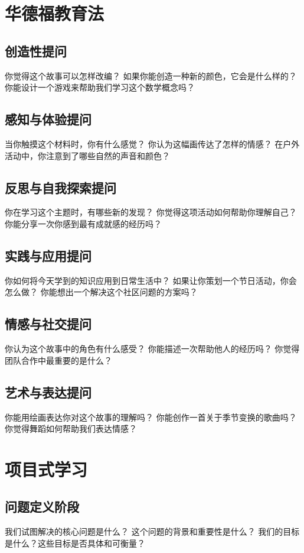 \documentclass[12pt]{book}
\begin{document}
\section{华德福教育法}
\subsection{创造性提问}
你觉得这个故事可以怎样改编？
如果你能创造一种新的颜色，它会是什么样的？
你能设计一个游戏来帮助我们学习这个数学概念吗？

\subsection{感知与体验提问}
当你触摸这个材料时，你有什么感觉？
你认为这幅画传达了怎样的情感？
在户外活动中，你注意到了哪些自然的声音和颜色？

\subsection{反思与自我探索提问}
你在学习这个主题时，有哪些新的发现？
你觉得这项活动如何帮助你理解自己？
你能分享一次你感到最有成就感的经历吗？

\subsection{实践与应用提问}
你如何将今天学到的知识应用到日常生活中？
如果让你策划一个节日活动，你会怎么做？
你能想出一个解决这个社区问题的方案吗？

\subsection{情感与社交提问}
你认为这个故事中的角色有什么感受？
你能描述一次帮助他人的经历吗？
你觉得团队合作中最重要的是什么？

\subsection{艺术与表达提问}
你能用绘画表达你对这个故事的理解吗？
你能创作一首关于季节变换的歌曲吗？
你觉得舞蹈如何帮助我们表达情感？


\section{项目式学习}
\subsection{问题定义阶段}
我们试图解决的核心问题是什么？
这个问题的背景和重要性是什么？
我们的目标是什么？这些目标是否具体和可衡量？
\end{document}
